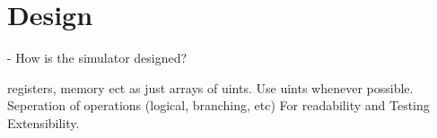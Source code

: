 \section*{Design}

- How is the simulator designed?

registers, memory ect as just arrays of uints.
Use uints whenever possible.
Seperation of operations (logical, branching, etc)
    For readability and Testing
Extensibility.